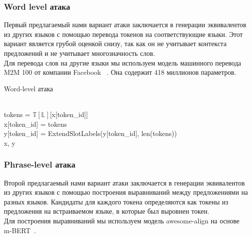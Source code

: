 \subsubsection{Word level атака}
Первый предлагаемый нами вариант атаки заключается в генерации эквивалентов из других языков с помощью перевода токенов на соответствующие языки.
Этот вариант является грубой оценкой снизу, так как он не учитывает контекста предложений и не учитывает многозначность слов. \\
Для перевода слов на другие языки мы используем модель машинного перевода M2M 100 от компании Facebook ~\cite{Fan2020BeyondEM}.
Она содержит 418 миллионов параметров.

\begin{algorithm}
    \caption{Word-level атака}
    \begin{algorithmic}
            \ind{}
                    \\
                    \ind\ind tokens = $\mathbb{T}[\mathbb{L}]$[x[token\_id]]\\
                    \ind\ind x[token\_id] = tokens\\
                    \ind\ind y[token\_id] = ExtendSlotLabels(y[token\_id], len(tokens))
            \EndIf \\
            \ind\Return x, y
        \EndFunction
    \end{algorithmic}\label{alg:algorithm1}
\end{algorithm}


\subsubsection{Phrase-level атака}
Второй предлагаемый нами вариант атаки заключается в генерации эквивалентов из других языков с помощью построения выравниваний между предложениями на разных языков.
Кандидаты для каждого токена определяются как токены из предложения на встраиваемом языке, в которые был выровнен токен. \\
Для построения выравниваний мы используем модель awesome-align на основе m-BERT~\cite{Dou2021WordAB}.

